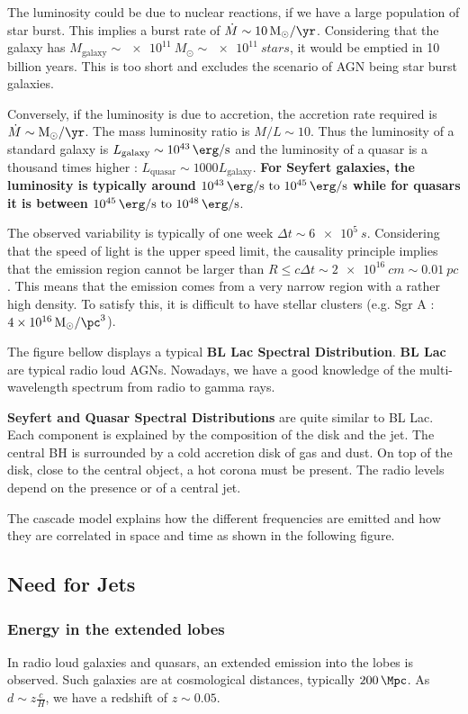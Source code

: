 \documentclass[10pt,a4paper,english]{article}
\begin{document}
The luminosity could be due to nuclear reactions, if we have a large population of star burst. This implies a burst rate of $\dot{M} \sim \SI{10}{M_\odot\per\yr}$. Considering that the galaxy has $M_\mathrm{galaxy} \sim \SI{e11}{M_\odot} \sim \SI{e11}{stars}$, it would be emptied in 10 billion years. This is too short and excludes the scenario of AGN being star burst galaxies.

Conversely, if the luminosity is due to accretion, the accretion rate required is $\dot{M} \sim \si{M_\odot\per\yr}$. The mass luminosity ratio is $M/L \sim 10$. Thus the luminosity of a standard galaxy is $L_\mathrm{galaxy} \sim \SI{e43}{\erg\per\s}$ and the luminosity of a quasar is a thousand times higher : $L_\mathrm{quasar}\sim 1000 L_\mathrm{galaxy}$. \textbf{For Seyfert galaxies, the luminosity is typically around $\SIrange{e43}{e45}{\erg\per\s}$ while for quasars it is between $\SIrange{e45}{e48}{\erg\per\s}$}.

The observed variability is typically of one week $\Delta t \sim \SI{6e5}{s}$. Considering that the speed of light is the upper speed limit, the causality principle implies that the emission region cannot be larger than $R \leq c\Delta t \sim \SI{2e16}{cm} \sim \SI{0.01}{pc}$. This means that the emission comes from a very narrow region with a rather high density. To satisfy this, it is difficult to have stellar clusters (e.g. Sgr A : $\SI{4e16}{M_\odot\per\pc^3}$).

The figure bellow  displays a typical \textbf{BL Lac Spectral Distribution}. \textbf{BL Lac} are typical radio loud AGNs. Nowadays, we have a good knowledge of the multi-wavelength spectrum from radio to gamma rays.

\textbf{Seyfert and Quasar Spectral Distributions} are quite similar to BL Lac. Each component is explained by the composition of the disk and the jet. The central BH is surrounded by a cold accretion disk of gas and dust. On top of the disk, close to the central object, a hot corona must be present. The radio levels depend on the presence or of a central jet.

The cascade model explains how the different frequencies are emitted and how they are correlated in space and time as shown in the following figure.
\subsection{Need for Jets}
\subsubsection{Energy in the extended lobes}
In radio loud galaxies and quasars, an extended emission into the lobes is observed. Such galaxies are at cosmological distances, typically $\SI{200}{\Mpc}$. As $d\sim z\frac{c }{H}$, we have a redshift of $z\sim 0.05$.
\end{document}
